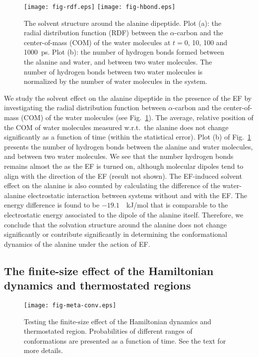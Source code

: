 \documentclass[a4paper,preprint,unsortedaddress,onecolumn]{revtex4-1}
\begin{document}
\begin{figure}
  \centering
  \texttt{[image: fig-rdf.eps]}
  \texttt{[image: fig-hbond.eps]}
  \caption{The solvent structure around the alanine dipeptide.  Plot
    (a): the radial distribution function (RDF) between the
    $\alpha$-carbon and the center-of-mass (COM) of the water molecules at
    $t = 0$, 10, 100 and 1000~ps.  Plot (b): the number of hydrogen
    bonds formed between the alanine and water, and between two water
    molecules.  The number of hydrogen bonds between two water
    molecules is normalized by the number of water molecules in the
    system.}
  \label{fig:tmp7a}
\end{figure}
We study the solvent effect on the alanine dipeptide in the presence of the EF by investigating
the radial distribution function between $\alpha$-carbon and the
center-of-mass (COM) of the water molecules
(see Fig.~\ref{fig:tmp7a}). The average, relative position of the COM of water molecules measured w.r.t.~the alanine does not change significantly as a function of time (within the statistical error). Plot (b) of
Fig.~\ref{fig:tmp7a} presents the number of hydrogen bonds between the
alanine and water molecules, and between two water molecules. We see that the
number hydrogen bonds remains almost the as the EF is turned on,
although molecular dipoles tend to align with the direction of the EF (result
not shown). 
The EF-induced solvent effect on the alanine is also counted by calculating the
difference of the water-alanine electrostatic interaction 
between systems without and with the EF.
The energy difference is found to be $-19.1$~~kJ/mol that is
comparable to the electrostatic energy associated to the dipole of the alanine itself.
Therefore, we conclude that the solvation structure around the
alanine does not change significantly or contribute significantly in determining the conformational dynamics of the alanine under the action of EF.






\subsection{The finite-size effect of the Hamiltonian dynamics and thermostated regions}

\begin{figure}
  \centering
  \texttt{[image: fig-meta-conv.eps]}
  \caption{Testing the finite-size effect of the Hamiltonian dynamics and thermostated region.
    Probabilities of different ranges of conformations are presented as a function of time.
    See the text for more details.
  }
  \label{fig:tmp7}
\end{figure}
\end{document}

